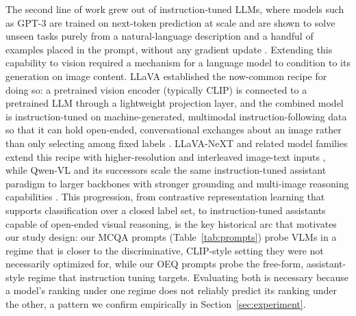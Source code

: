 \documentclass[10pt,letterpaper]{article}
\begin{document}
The second line of work grew out of instruction-tuned LLMs, where models such as GPT-3 are trained on next-token prediction at scale and are shown to solve unseen tasks purely from a natural-language description and a handful of examples placed in the prompt, without any gradient update \cite{brown_language_2020}. Extending this capability to vision required a mechanism for a language model to condition to its generation on image content. LLaVA established the now-common recipe for doing so: a pretrained vision encoder (typically CLIP) is connected to a pretrained LLM through a lightweight projection layer, and the combined model is instruction-tuned on machine-generated, multimodal instruction-following data so that it can hold open-ended, conversational exchanges about an image rather than only selecting among fixed labels \cite{liu_visual_2023}. LLaVA-NeXT and related model families extend this recipe with higher-resolution and interleaved image-text inputs \cite{li_llava-next-interleave_2024}, while Qwen-VL and its successors scale the same instruction-tuned assistant paradigm to larger backbones with stronger grounding and multi-image reasoning capabilities \cite{bai_qwen-vl_2023}. This progression, from contrastive representation learning that supports classification over a closed label set, to instruction-tuned assistants capable of open-ended visual reasoning, is the key historical arc that motivates our study design: our MCQA prompts (Table~\ref{tab:prompts}) probe VLMs in a regime that is closer to the discriminative, CLIP-style setting they were not necessarily optimized for, while our OEQ prompts probe the free-form, assistant-style regime that instruction tuning targets. Evaluating both is necessary because a model's ranking under one regime does not reliably predict its ranking under the other, a pattern we confirm empirically in Section~\ref{sec:experiment}.
\end{document}
